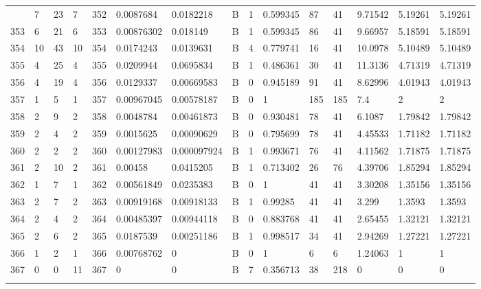 \begin{latin}
\begin{longtable}{lllllllllllllll}
\begin{comment}
	352 & 7  & 23  & 7  & 352 & 0.0087684      & 0.0182218      & B & 1  & 0.599345 & 87   & 41   & 9.71542 & 5.19261 & 5.19261 \\
	353 & 6  & 21  & 6  & 353 & 0.00876302     & 0.018149       & B & 1  & 0.599345 & 86   & 41   & 9.66957 & 5.18591 & 5.18591 \\
	354 & 10 & 43  & 10 & 354 & 0.0174243      & 0.0139631      & B & 4  & 0.779741 & 16   & 41   & 10.0978 & 5.10489 & 5.10489 \\
	355 & 4  & 25  & 4  & 355 & 0.0209944      & 0.0695834      & B & 1  & 0.486361 & 30   & 41   & 11.3136 & 4.71319 & 4.71319 \\
	356 & 4  & 19  & 4  & 356 & 0.0129337      & 0.00669583     & B & 0  & 0.945189 & 91   & 41   & 8.62996 & 4.01943 & 4.01943 \\
	357 & 1  & 5   & 1  & 357 & 0.00967045     & 0.00578187     & B & 0  & 1        & 185  & 185  & 7.4     & 2       & 2       \\
	358 & 2  & 9   & 2  & 358 & 0.0048784      & 0.00461873     & B & 0  & 0.930481 & 78   & 41   & 6.1087  & 1.79842 & 1.79842 \\
	359 & 2  & 4   & 2  & 359 & 0.0015625      & 0.00090629     & B & 0  & 0.795699 & 78   & 41   & 4.45533 & 1.71182 & 1.71182 \\
	360 & 2  & 2   & 2  & 360 & 0.00127983     & 0.000097924    & B & 1  & 0.993671 & 76   & 41   & 4.11562 & 1.71875 & 1.71875 \\
	361 & 2  & 10  & 2  & 361 & 0.00458        & 0.0415205      & B & 1  & 0.713402 & 26   & 76   & 4.39706 & 1.85294 & 1.85294 \\
	362 & 1  & 7   & 1  & 362 & 0.00561849     & 0.0235383      & B & 0  & 1        & 41   & 41   & 3.30208 & 1.35156 & 1.35156 \\
	363 & 2  & 7   & 2  & 363 & 0.00919168     & 0.00918133     & B & 1  & 0.99285  & 41   & 41   & 3.299   & 1.3593  & 1.3593  \\
	364 & 2  & 4   & 2  & 364 & 0.00485397     & 0.00944118     & B & 0  & 0.883768 & 41   & 41   & 2.65455 & 1.32121 & 1.32121 \\
	365 & 2  & 6   & 2  & 365 & 0.0187539      & 0.00251186     & B & 1  & 0.998517 & 34   & 41   & 2.94269 & 1.27221 & 1.27221 \\
	366 & 1  & 2   & 1  & 366 & 0.00768762     & 0              & B & 0  & 1        & 6    & 6    & 1.24063 & 1       & 1       \\
	367 & 0  & 0   & 11 & 367 & 0              & 0              & B & 7  & 0.356713 & 38   & 218  & 0       & 0       & 0       \\

\end{comment}
\end{longtable}
\end{latin}
